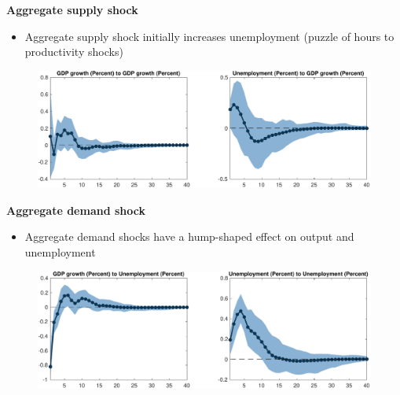 \documentclass[10pt,english,t,aspectratio=169,ignorenonframetext]{beamer}
\begin{document}

\begin{frame}
{\textbf{Aggregate supply shock}}

\begin{itemize}
\item Aggregate supply shock initially increases unemployment (puzzle of
hours to productivity shocks)
\end{itemize}

\begin{figure}[h]
\includegraphics[width=.8\textwidth]{BQ_IR_1.pdf}
\end{figure}
\end{frame}


\begin{frame}
{\textbf{Aggregate demand shock}}

\begin{itemize}
\item Aggregate demand shocks have a hump-shaped effect on output and
unemployment
\end{itemize}

\begin{figure}[h]
\vspace{.3cm}\includegraphics[width=.8\textwidth]{BQ_IR_2.pdf}
\end{figure}
\end{frame}

\end{document}

